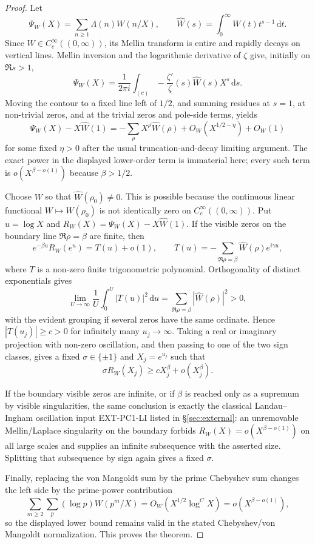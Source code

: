 \documentclass[11pt]{article}
\theoremstyle{definition}
\newcommand{\dd}{\mathrm d}
\begin{document}
\begin{proof}
Let
\[
  \Psi_W(X)=\sum_{n\ge1}\Lambda(n)W(n/X),\qquad
  \widehat W(s)=\int_0^\infty W(t)t^{s-1}\,\dd t .
\]
Since $W\in C_c^\infty((0,\infty))$, its Mellin transform is entire and rapidly decays on vertical lines.  Mellin inversion and the logarithmic derivative of $\zeta$ give, initially on $\Re s>1$,
\[
  \Psi_W(X)=\frac{1}{2\pi i}\int_{(c)}-\frac{\zeta'}{\zeta}(s)\widehat W(s)X^s\,\dd s .
\]
Moving the contour to a fixed line left of $1/2$, and summing residues at $s=1$, at non-trivial zeros, and at the trivial zeros and pole-side terms, yields
\[
  \Psi_W(X)-X\widehat W(1)
   =-\sum_\rho X^\rho\widehat W(\rho)+O_W(X^{1/2-\eta})+O_W(1)
\]
for some fixed $\eta>0$ after the usual truncation-and-decay limiting argument.  The exact power in the displayed lower-order term is immaterial here; every such term is $o(X^{\beta-o(1)})$ because $\beta>1/2$.

Choose $W$ so that $\widehat W(\rho_0)\ne0$.  This is possible because the continuous linear functional $W\mapsto\widehat W(\rho_0)$ is not identically zero on $C_c^\infty((0,\infty))$.  Put $u=\log X$ and $R_W(X)=\Psi_W(X)-X\widehat W(1)$.  If the visible zeros on the boundary line $\Re\rho=\beta$ are finite, then
\[
  e^{-\beta u}R_W(e^u)=T(u)+o(1),\qquad
  T(u)=-\sum_{\Re\rho=\beta} \widehat W(\rho)e^{i\gamma u},
\]
where $T$ is a non-zero finite trigonometric polynomial.  Orthogonality of distinct exponentials gives
\[
  \lim_{U\to\infty}\frac1U\int_0^U |T(u)|^2\,\dd u
   =\sum_{\Re\rho=\beta}|\widehat W(\rho)|^2>0,
\]
with the evident grouping if several zeros have the same ordinate.  Hence $|T(u_j)|\ge c>0$ for infinitely many $u_j\to\infty$.  Taking a real or imaginary projection with non-zero oscillation, and then passing to one of the two sign classes, gives a fixed $\sigma\in\{\pm1\}$ and $X_j=e^{u_j}$ such that
\[
  \sigma R_W(X_j)\ge cX_j^\beta+o(X_j^\beta).
\]

If the boundary visible zeros are infinite, or if $\beta$ is reached only as a supremum by visible singularities, the same conclusion is exactly the classical Landau--Ingham oscillation input EXT-PC1-LI listed in \S\ref{sec:external}: an unremovable Mellin/Laplace singularity on the boundary forbids $R_W(X)=o(X^{\beta-o(1)})$ on all large scales and supplies an infinite subsequence with the asserted size.  Splitting that subsequence by sign again gives a fixed $\sigma$.

Finally, replacing the von Mangoldt sum by the prime Chebyshev sum changes the left side by the prime-power contribution
\[
  \sum_{m\ge2}\sum_p (\log p) W(p^m/X)=O_W(X^{1/2}\log^C X)=o(X^{\beta-o(1)}),
\]
so the displayed lower bound remains valid in the stated Chebyshev/von Mangoldt normalization.  This proves the theorem.
\end{proof}
\end{document}
